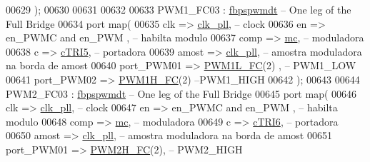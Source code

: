 \begin{DoxyCode}
00629          \textcolor{vhdlchar}{)};                  
00630          
00631          
00632 
00633 PWM1\_FC03 : \hyperlink{classfbpspwmdt}{fbpspwmdt} -- One leg \textcolor{keywordflow}{of} the Full Bridge
00634     \textcolor{keywordflow}{port} \textcolor{keywordflow}{map}( 
00635          clk => \hyperlink{class_d_e0___n_a_n_o___v_f_1_1_m_a_i_n_a1d63ebfc050c1099e1dff991817ec3b0}{clk\_pll},\textcolor{keyword}{ -- clock}
00636          en => en\_PWMC \textcolor{keywordflow}{and} en\_PWM  ,\textcolor{keyword}{ -- habilta modulo}
00637          comp  => \hyperlink{class_d_e0___n_a_n_o___v_f_1_1_m_a_i_n_add77a3ba2fff852407a90f156620722c}{mc},\textcolor{keyword}{ -- moduladora     }
00638          c => \hyperlink{class_d_e0___n_a_n_o___v_f_1_1_m_a_i_n_abc70ad694fb9be4565a31c4cde31d225}{cTRI5},\textcolor{keyword}{ -- portadora}
00639          amost => \hyperlink{class_d_e0___n_a_n_o___v_f_1_1_m_a_i_n_a1d63ebfc050c1099e1dff991817ec3b0}{clk\_pll},\textcolor{keyword}{ -- amostra moduladora na borda de amost}
00640          port\_PWM01  => \hyperlink{class_d_e0___n_a_n_o___v_f_ac9a5e24e4c9b96a7ee1750285ff2af08}{PWM1L\_FC}\textcolor{vhdlchar}{(}\textcolor{vhdllogic}{2}\textcolor{vhdlchar}{)} ,\textcolor{keyword}{ -- PWM1\_LOW}
00641          port\_PWM02 => \hyperlink{class_d_e0___n_a_n_o___v_f_ae64c7416adbe802e6aa4125230fad012}{PWM1H\_FC}\textcolor{vhdlchar}{(}\textcolor{vhdllogic}{2}\textcolor{vhdlchar}{)}\textcolor{keyword}{   --PWM1\_HIGH}
00642          \textcolor{vhdlchar}{)};  
00643         
00644 PWM2\_FC03 : \hyperlink{classfbpspwmdt}{fbpspwmdt} -- One leg \textcolor{keywordflow}{of} the Full Bridge
00645     \textcolor{keywordflow}{port} \textcolor{keywordflow}{map}( 
00646          clk => \hyperlink{class_d_e0___n_a_n_o___v_f_1_1_m_a_i_n_a1d63ebfc050c1099e1dff991817ec3b0}{clk\_pll},\textcolor{keyword}{ -- clock}
00647          en => en\_PWMC \textcolor{keywordflow}{and} en\_PWM  ,\textcolor{keyword}{ -- habilta modulo}
00648          comp  => \hyperlink{class_d_e0___n_a_n_o___v_f_1_1_m_a_i_n_add77a3ba2fff852407a90f156620722c}{mc},\textcolor{keyword}{ -- moduladora     }
00649          c => \hyperlink{class_d_e0___n_a_n_o___v_f_1_1_m_a_i_n_a3fba77c2013e6f78c5035b08503b220c}{cTRI6},\textcolor{keyword}{ -- portadora}
00650          amost => \hyperlink{class_d_e0___n_a_n_o___v_f_1_1_m_a_i_n_a1d63ebfc050c1099e1dff991817ec3b0}{clk\_pll},\textcolor{keyword}{ -- amostra moduladora na borda de amost}
00651          port\_PWM01  => \hyperlink{class_d_e0___n_a_n_o___v_f_a8318940c01015b267904bdca0e01c2a2}{PWM2H\_FC}\textcolor{vhdlchar}{(}\textcolor{vhdllogic}{2}\textcolor{vhdlchar}{)},\textcolor{keyword}{ -- PWM2\_HIGH}

\end{DoxyCode}
